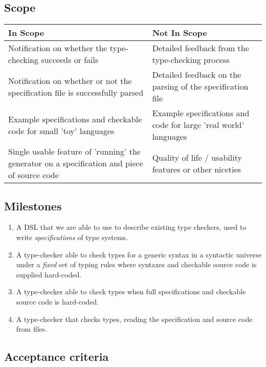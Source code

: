   \subsection{Scope}
  \label{sec-scope}

  \begin{center}
  \begin{tabular}{p{20em}|p{18em}}
    \large In Scope & \large Not In Scope \\ \hline \hline
    Notification on whether the type-checking succeeds
    or fails
    & Detailed feedback from the type-checking process \\ \hline
    Notification on whether or not the specification file is
    successfully parsed
    & Detailed feedback on the parsing of the specification file \\ \hline
    Example specifications and checkable code for small 'toy' languages
    & Example specifications and code for large 'real world' languages \\ \hline
    Single usable feature of 'running' the generator on a
    specification and piece of source code
    & Quality of life / usability features or other niceties \\ \hline
  \end{tabular}            
  \end{center}        
  
  \subsection{Milestones}
  \label{section-milestones}

  \begin{enumerate}
  \item A DSL that we are able to use to describe existing
    type checkers, used to write \emph{specifications} of type systems.
  \item A type-checker able to check types for a generic syntax
    in a syntactic universe under a \emph{fixed} set of typing rules
    where syntaxes and checkable source code is supplied hard-coded.
  \item A type-checker able to check types when full specifications
    and checkable source code is hard-coded.
  \item A type-checker  that checks types, reading
    the specification and source code from files.
  \end{enumerate}
  
  \subsection{Acceptance criteria}
  \label{sec-acceptance}

